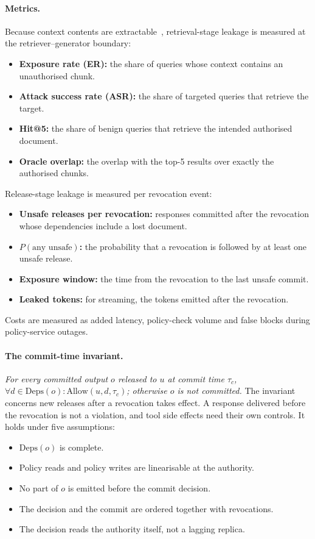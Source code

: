 \documentclass[10pt]{article}
\begin{document}
\paragraph{Metrics.}
Because context contents are extractable~\cite{zeng2024good,qi2024spill}, retrieval-stage leakage is measured at the retriever--generator boundary:
\begin{itemize}\itemsep0pt
\item \textbf{Exposure rate (ER):} the share of queries whose context contains an unauthorised chunk.
\item \textbf{Attack success rate (ASR):} the share of targeted queries that retrieve the target.
\item \textbf{Hit@5:} the share of benign queries that retrieve the intended authorised document.
\item \textbf{Oracle overlap:} the overlap with the top-5 results over exactly the authorised chunks.
\end{itemize}
Release-stage leakage is measured per revocation event:
\begin{itemize}\itemsep0pt
\item \textbf{Unsafe releases per revocation:} responses committed after the revocation whose dependencies include a lost document.
\item \textbf{$P(\text{any unsafe})$:} the probability that a revocation is followed by at least one unsafe release.
\item \textbf{Exposure window:} the time from the revocation to the last unsafe commit.
\item \textbf{Leaked tokens:} for streaming, the tokens emitted after the revocation.
\end{itemize}
Costs are measured as added latency, policy-check volume and false blocks during policy-service outages.

\paragraph{The commit-time invariant.}
\emph{For every committed output $o$ released to $u$ at commit time $\tau_c$, $\forall d\in\mathrm{Deps}(o): \mathrm{Allow}(u,d,\tau_c)$; otherwise $o$ is not committed.} The invariant concerns new releases after a revocation takes effect. A response delivered before the revocation is not a violation, and tool side effects need their own controls. It holds under five assumptions:
\begin{itemize}\itemsep0pt
\item[(C1)] $\mathrm{Deps}(o)$ is complete.
\item[(C2)] Policy reads and policy writes are linearisable at the authority.
\item[(C3)] No part of $o$ is emitted before the commit decision.
\item[(C4)] The decision and the commit are ordered together with revocations.
\item[(C5)] The decision reads the authority itself, not a lagging replica.
\end{itemize}
\end{document}
